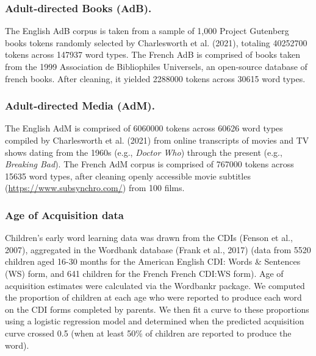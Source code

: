 \documentclass[10pt, letterpaper]{article}
\begin{document}
\hypertarget{adult-directed-books-adb.}{%
\subsubsection{Adult-directed Books
(AdB).}\label{adult-directed-books-adb.}}

The English AdB corpus is taken from a sample of 1,000 Project Gutenberg
books tokens randomly selected by Charlesworth et al. (2021), totaling
40252700 tokens across 147937 word types. The French AdB is comprised of
books taken from the 1999 Association de Bibliophiles Universels, an
open-source database of french books. After cleaning, it yielded 2288000
tokens across 30615 word types.

\hypertarget{adult-directed-media-adm.}{%
\subsubsection{Adult-directed Media
(AdM).}\label{adult-directed-media-adm.}}

The English AdM is comprised of 6060000 tokens across 60626 word types
compiled by Charlesworth et al. (2021) from online transcripts of movies
and TV shows dating from the 1960s (e.g., \emph{Doctor Who}) through the
present (e.g., \emph{Breaking Bad}). The French AdM corpus is comprised
of 767000 tokens across 15635 word types, after cleaning openly
accessible movie subtitles (\url{https://www.subsynchro.com/}) from 100
films.

\hypertarget{age-of-acquisition-data}{%
\subsubsection{Age of Acquisition data}\label{age-of-acquisition-data}}

Children's early word learning data was drawn from the CDIs (Fenson et
al., 2007), aggregated in the Wordbank database (Frank et al., 2017)
(data from 5520 children aged 16-30 months for the American English CDI:
Words \& Sentences (WS) form, and 641 children for the French French
CDI:WS form). Age of acquisition estimates were calculated via the
Wordbankr package. We computed the proportion of children at each age
who were reported to produce each word on the CDI forms completed by
parents. We then fit a curve to these proportions using a logistic
regression model and determined when the predicted acquisition curve
crossed 0.5 (when at least 50\% of children are reported to produce the
word).
\end{document}
